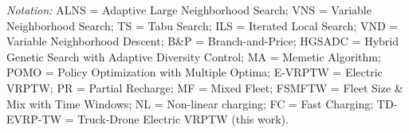 \begin{table}[t]
\vspace{4pt}
\footnotesize
\textit{Notation:} ALNS = Adaptive Large Neighborhood Search; VNS = Variable Neighborhood Search;
TS = Tabu Search; ILS = Iterated Local Search; VND = Variable Neighborhood Descent;
B\&P = Branch-and-Price; HGSADC = Hybrid Genetic Search with Adaptive Diversity Control;
MA = Memetic Algorithm; POMO = Policy Optimization with Multiple Optima;
E-VRPTW = Electric VRPTW; PR = Partial Recharge; MF = Mixed Fleet;
FSMFTW = Fleet Size \& Mix with Time Windows; NL = Non-linear charging;
FC = Fast Charging; TD-EVRP-TW = Truck-Drone Electric VRPTW (this work).
\end{table}
